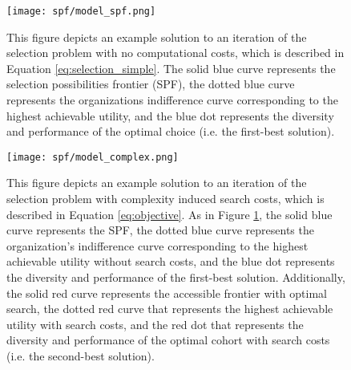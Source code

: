 
\begin{figure}[!htb]
    \centering
        \caption{This figure depicts an example solution to an iteration of the selection problem with no computational costs, which is described in Equation \ref{eq:selection_simple}. The solid blue curve represents the selection possibilities frontier (SPF), the dotted blue curve represents the organizations indifference curve corresponding to the highest achievable utility, and the blue dot represents the diversity and performance of the optimal choice (i.e. the first-best solution). }\label{fig:model_spf}
      \texttt{[image: spf/model\_spf.png]} 
    \end{figure}
    
    \newpage
    \begin{figure}[!htb]
    \centering
        \caption{This figure depicts an example solution to an iteration of the selection problem with complexity induced search costs, which is described in Equation \ref{eq:objective}. As in Figure \ref{fig:model_spf}, the solid blue curve represents the SPF, the dotted blue curve represents the organization's indifference curve corresponding to the highest achievable utility without search costs, and the blue dot represents the diversity and performance of the first-best solution. Additionally, the solid red curve represents the accessible frontier with optimal search, the dotted red curve that represents the highest achievable utility with search costs, and the red dot that represents the diversity and performance of the optimal cohort with search costs (i.e. the second-best solution).}\label{fig:model_complex}
      \texttt{[image: spf/model\_complex.png]} 
    \end{figure}
    
